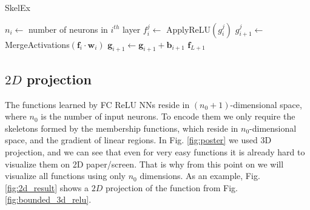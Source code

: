 \documentclass{article}
\begin{document}
\begin{algorithm}
    \caption{SkelEx}\label{alg:skelex}
    \begin{algorithmic}
        \Require $n_i \gets$ number of neurons in $i^{th}$ layer
                \State $f_i^j \gets$ ApplyReLU$(g_i^j)$
            \EndFor
                \State $g_{i+1}^j \gets$ MergeActivations$(\mathbf{f}_i \cdot \mathbf{w}_i)$
            \EndFor
            \State $\mathbf{g}_{i+1} \gets \mathbf{g}_{i+1} + \mathbf{b}_{i+1}$
        \EndFor
        \State \Return $\mathbf{f}_{L+1}$  
    \end{algorithmic}
\end{algorithm}
\vspace{-5mm}

\subsection{$2D$ projection}

The functions learned by FC ReLU NNs reside in $(n_0+1)$-dimensional space, where $n_0$ is the number of input neurons. To encode them we only require the skeletons formed by the membership functions, which reside in $n_0$-dimensional space, and the gradient of linear regions. In Fig. \ref{fig:poster} we used 3D projection, and we can see that even for very easy functions it is already hard to visualize them on 2D paper/screen. That is why from this point on we will visualize all functions using only $n_0$ dimensions. As an example, Fig. \ref{fig:2d_result} shows a $2D$ projection of the function from Fig. \ref{fig:bounded_3d_relu}.
\end{document}
